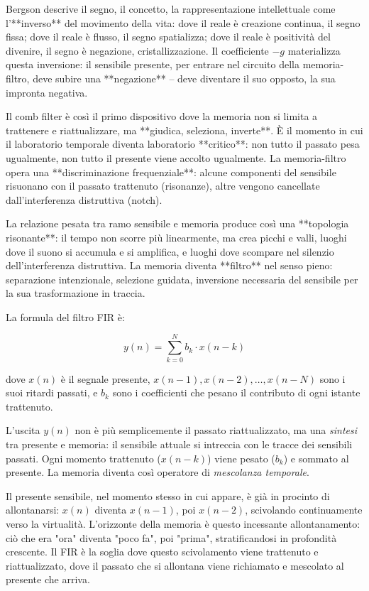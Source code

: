 Bergson descrive il segno, il concetto, la rappresentazione intellettuale come l'**inverso** del movimento della vita: dove il reale è creazione continua, il segno fissa; dove il reale è flusso, il segno spatializza; dove il reale è positività del divenire, il segno è negazione, cristallizzazione. Il coefficiente $-g$ materializza questa inversione: il sensibile presente, per entrare nel circuito della memoria-filtro, deve subire una **negazione** – deve diventare il suo opposto, la sua impronta negativa.

Il comb filter è così il primo dispositivo dove la memoria non si limita a trattenere e riattualizzare, ma **giudica, seleziona, inverte**. È il momento in cui il laboratorio temporale diventa laboratorio **critico**: non tutto il passato pesa ugualmente, non tutto il presente viene accolto ugualmente. La memoria-filtro opera una **discriminazione frequenziale**: alcune componenti del sensibile risuonano con il passato trattenuto (risonanze), altre vengono cancellate dall'interferenza distruttiva (notch).

La relazione pesata tra ramo sensibile e memoria produce così una **topologia risonante**: il tempo non scorre più linearmente, ma crea picchi e valli, luoghi dove il suono si accumula e si amplifica, e luoghi dove scompare nel silenzio dell'interferenza distruttiva. La memoria diventa **filtro** nel senso pieno: separazione intenzionale, selezione guidata, inversione necessaria del sensibile per la sua trasformazione in traccia.




La formula del filtro FIR è:

\begin{equation}
y(n) = \sum_{k=0}^{N} b_k \cdot x(n-k)
\end{equation}

dove $x(n)$ è il segnale presente, $x(n-1), x(n-2), \ldots, x(n-N)$ sono i suoi ritardi passati, e $b_k$ sono i coefficienti che pesano il contributo di ogni istante trattenuto.

L'uscita $y(n)$ non è più semplicemente il passato riattualizzato, ma una \emph{sintesi} tra presente e memoria: il sensibile attuale si intreccia con le tracce dei sensibili passati. Ogni momento trattenuto ($x(n-k)$) viene pesato ($b_k$) e sommato al presente. La memoria diventa così operatore di \emph{mescolanza temporale}.

Il presente sensibile, nel momento stesso in cui appare, è già in procinto di allontanarsi: $x(n)$ diventa $x(n-1)$, poi $x(n-2)$, scivolando continuamente verso la virtualità. L'orizzonte della memoria è questo incessante allontanamento: ciò che era "ora" diventa "poco fa", poi "prima", stratificandosi in profondità crescente. Il FIR è la soglia dove questo scivolamento viene trattenuto e riattualizzato, dove il passato che si allontana viene richiamato e mescolato al presente che arriva.

